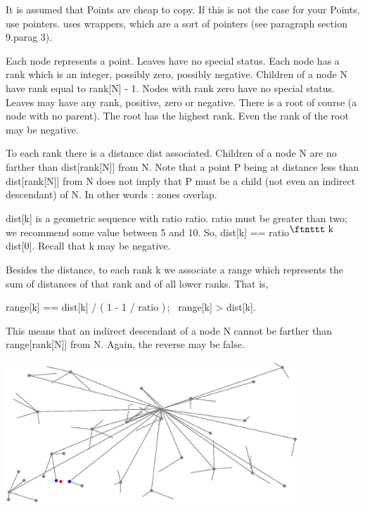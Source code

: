 It is assumed that {\codett Point}s are cheap to copy.
If this is not the case for your {\codett Point}s, use pointers.
{\ManiFEM} uses wrappers, which are a sort of pointers (see paragraph
\numb section 9.\numb parag 3).

Each node represents a point.
Leaves have no special status.
Each node has a rank which is an integer, possibly zero, possibly negative.
Children of a node {\codett N} have rank equal to {\codett rank[N] - 1}.
Nodes with rank zero have no special status.
Leaves may have any rank, positive, zero or negative.
There is a {\codett root} of course (a node with no parent).
The root has the highest rank.
Even the rank of the root may be negative.

To each rank there is a distance {\codett dist} associated.
Children of a node {\codett N} are no farther than {\codett dist[rank[N]]} from {\codett N}.
Note that a point {\codett P} being at distance less than {\codett dist[rank[N]]} from
{\codett N} does not imply that {\codett P} must be a child (not even an indirect descendant)
of {\codett N}.
In other words : zones overlap.

{\codett dist[k]} is a geometric sequence with ratio {\codett ratio}.
{\codett ratio} must be greater than two; we recommend some value between 5 and 10.
So, {\codett dist[k] == ratio}$^{\hbox{\ftnttt k }}${\codett dist[0]}.
Recall that {\codett k} may be negative.

Besides the {\codett dist}ance, to each rank {\codett k} we associate a {\codett range}
which represents the sum of distances of that rank and of all lower ranks.
That is,
\smallskip\centerline
{{\codett range[k] == dist[k] / ( 1 - 1 / ratio )$\,$}; \ {\codett range[k] > dist[k]}.}
\smallskip\noindent
This means that an indirect descendant of a node {\codett N} cannot be farther than
{\codett range[rank[N]]} from {\codett N}.
Again, the reverse may be false.

\centerline{\includegraphics[width=110mm]{metric-tree.eps}}

